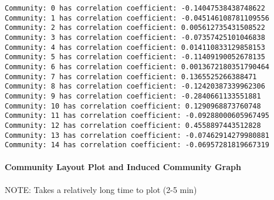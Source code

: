 \documentclass[11pt]{article}
\begin{document}
    \begin{Verbatim}[commandchars=\\\{\}]
Community: 0 has correlation coefficient: -0.14047538438748622
Community: 1 has correlation coefficient: -0.045146108781109556
Community: 2 has correlation coefficient: 0.005612735431508522
Community: 3 has correlation coefficient: -0.07357425101046838
Community: 4 has correlation coefficient: 0.014110833129858153
Community: 5 has correlation coefficient: -0.11409190052678135
Community: 6 has correlation coefficient: 0.0013672180351790464
Community: 7 has correlation coefficient: 0.1365525266388471
Community: 8 has correlation coefficient: -0.12420387339962306
Community: 9 has correlation coefficient: -0.2840661133551881
Community: 10 has correlation coefficient: 0.1290968873760748
Community: 11 has correlation coefficient: -0.09288000605967495
Community: 12 has correlation coefficient: 0.4558897443512828
Community: 13 has correlation coefficient: -0.07462914279980881
Community: 14 has correlation coefficient: -0.06957281819667319

    \end{Verbatim}

    \paragraph{Community Layout Plot and Induced Community
Graph}\label{community-layout-plot-and-induced-community-graph}

    NOTE: Takes a relatively long time to plot (2-5 min)
\end{document}
